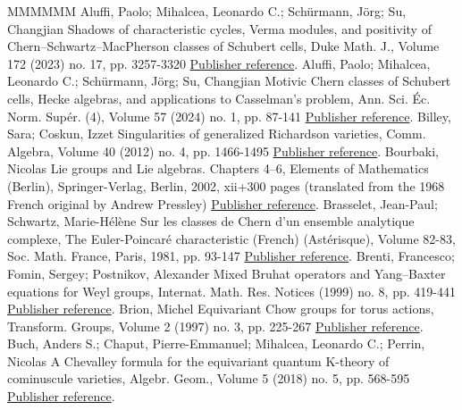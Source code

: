 \begin{thebibliography}{MMMMMM}
 Aluffi, Paolo; Mihalcea, Leonardo C.; Schürmann, Jörg; Su, Changjian Shadows of characteristic cycles, Verma modules, and positivity of Chern–Schwartz–MacPherson classes of Schubert cells, Duke Math. J., Volume 172 (2023) no. 17, pp. 3257-3320 \href{https://alco.centre-mersenne.org/articles/10.5802/alco.428/#AMSS:shadows}{Publisher reference}.
 Aluffi, Paolo; Mihalcea, Leonardo C.; Schürmann, Jörg; Su, Changjian Motivic Chern classes of Schubert cells, Hecke algebras, and applications to Casselman’s problem, Ann. Sci. Éc. Norm. Supér. (4), Volume 57 (2024) no. 1, pp. 87-141 \href{https://alco.centre-mersenne.org/articles/10.5802/alco.428/#AMSS:motivic}{Publisher reference}.
 Billey, Sara; Coskun, Izzet Singularities of generalized Richardson varieties, Comm. Algebra, Volume 40 (2012) no. 4, pp. 1466-1495 \href{https://alco.centre-mersenne.org/articles/10.5802/alco.428/#billey.coskun:singularities}{Publisher reference}.
 Bourbaki, Nicolas Lie groups and Lie algebras. Chapters 4–6, Elements of Mathematics (Berlin), Springer-Verlag, Berlin, 2002, xii+300 pages (translated from the 1968 French original by Andrew Pressley) \href{https://alco.centre-mersenne.org/articles/10.5802/alco.428/#bourbaki:Lie4-6}{Publisher reference}.
 Brasselet, Jean-Paul; Schwartz, Marie-Hélène Sur les classes de Chern d’un ensemble analytique complexe, The Euler-Poincaré characteristic (French) (Astérisque), Volume 82-83, Soc. Math. France, Paris, 1981, pp. 93-147 \href{https://alco.centre-mersenne.org/articles/10.5802/alco.428/#BS81}{Publisher reference}.
 Brenti, Francesco; Fomin, Sergey; Postnikov, Alexander Mixed Bruhat operators and Yang–Baxter equations for Weyl groups, Internat. Math. Res. Notices (1999) no. 8, pp. 419-441 \href{https://alco.centre-mersenne.org/articles/10.5802/alco.428/#BFP99}{Publisher reference}.
 Brion, Michel Equivariant Chow groups for torus actions, Transform. Groups, Volume 2 (1997) no. 3, pp. 225-267 \href{https://alco.centre-mersenne.org/articles/10.5802/alco.428/#brion:eq-chow}{Publisher reference}.
 Buch, Anders S.; Chaput, Pierre-Emmanuel; Mihalcea, Leonardo C.; Perrin, Nicolas A Chevalley formula for the equivariant quantum K-theory of cominuscule varieties, Algebr. Geom., Volume 5 (2018) no. 5, pp. 568-595 \href{https://alco.centre-mersenne.org/articles/10.5802/alco.428/#BCMP:QKChev}{Publisher reference}.

\end{thebibliography}

